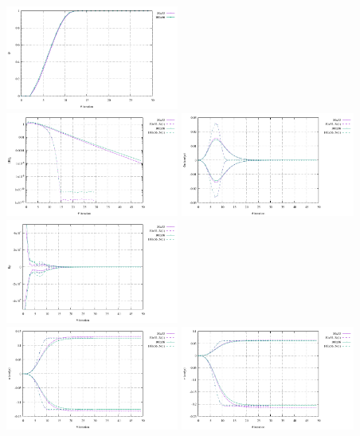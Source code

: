 \begin{center}
\includegraphics[width=5.7cm]{python_codes/fieldstone_87/results/experiment_03/theta}\\
\includegraphics[width=5.7cm]{python_codes/fieldstone_87/results/experiment_03/conv}
\includegraphics[width=5.7cm]{python_codes/fieldstone_87/results/experiment_03/du}
\includegraphics[width=5.7cm]{python_codes/fieldstone_87/results/experiment_03/dp}\\
\includegraphics[width=5.7cm]{python_codes/fieldstone_87/results/experiment_03/u}
\includegraphics[width=5.7cm]{python_codes/fieldstone_87/results/experiment_03/v}

\end{center}
